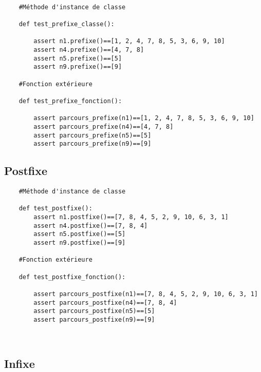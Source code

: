 \documentclass{article}
\begin{document}
\begin{verbatim}

    #Méthode d'instance de classe

    def test_prefixe_classe():
        
        assert n1.prefixe()==[1, 2, 4, 7, 8, 5, 3, 6, 9, 10]
        assert n4.prefixe()==[4, 7, 8]
        assert n5.prefixe()==[5]
        assert n9.prefixe()==[9]

    #Fonction extérieure

    def test_prefixe_fonction():
    
        assert parcours_prefixe(n1)==[1, 2, 4, 7, 8, 5, 3, 6, 9, 10]
        assert parcours_prefixe(n4)==[4, 7, 8]
        assert parcours_prefixe(n5)==[5]
        assert parcours_prefixe(n9)==[9]
\end{verbatim}
\newpage
\subsection{Postfixe}

\renewcommand{\theFancyVerbLine}{
  \sffamily\textcolor[rgb]{0.5,0.5,0.5}{\scriptsize\arabic{FancyVerbLine}}}

\begin{verbatim}
    #Méthode d'instance de classe

    def test_postfixe():
        assert n1.postfixe()==[7, 8, 4, 5, 2, 9, 10, 6, 3, 1]
        assert n4.postfixe()==[7, 8, 4]
        assert n5.postfixe()==[5]
        assert n9.postfixe()==[9]

    #Fonction extérieure

    def test_postfixe_fonction():
    
        assert parcours_postfixe(n1)==[7, 8, 4, 5, 2, 9, 10, 6, 3, 1]
        assert parcours_postfixe(n4)==[7, 8, 4]
        assert parcours_postfixe(n5)==[5]
        assert parcours_postfixe(n9)==[9]
    


\end{verbatim}

\subsection{Infixe}
\end{document}
